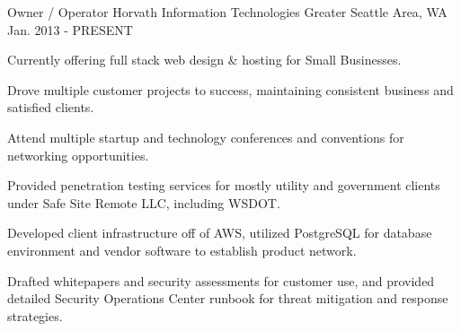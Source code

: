 


\begin{cventries}


\cventry
{Owner / Operator} %
{Horvath Information Technologies} %
{Greater Seattle Area, WA} %
{Jan. 2013 - PRESENT} %
{ %
\begin{cvitems}
\item {Currently offering full stack web design \& hosting for Small Businesses.}
\item {Drove multiple customer projects to success, maintaining consistent business and satisfied clients.}
\item {Attend multiple startup and technology conferences and conventions for networking opportunities.}
\item {Provided penetration testing services for mostly utility and government clients under Safe Site Remote LLC, including WSDOT.}
\item {Developed client infrastructure off of AWS, utilized PostgreSQL for database environment and vendor software to establish product network.}
\item {Drafted whitepapers and security assessments for customer use, and provided detailed Security Operations Center runbook for threat mitigation and response strategies.}
\end{cvitems}
}



\end{cventries}
